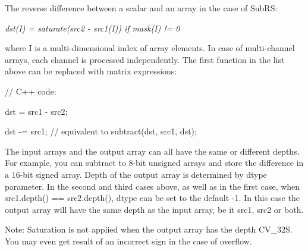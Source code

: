 \begin{DoxyItemize}
\item The reverse difference between a scalar and an array in the case of {\ttfamily Sub\+RS}\+: 
\end{DoxyItemize}

{\itshape dst(\+I) = saturate(src2 -\/ src1(\+I)) if mask(\+I) != 0}

where {\ttfamily I} is a multi-\/dimensional index of array elements. In case of multi-\/channel arrays, each channel is processed independently. The first function in the list above can be replaced with matrix expressions\+: {\ttfamily }

{\ttfamily }

{\ttfamily }

{\ttfamily // C++ code\+:}

{\ttfamily }

{\ttfamily }

{\ttfamily dst = src1 -\/ src2;}

{\ttfamily }

{\ttfamily }

{\ttfamily dst -\/= src1; // equivalent to subtract(dst, src1, dst);}

{\ttfamily }

{\ttfamily }

{\ttfamily The input arrays and the output array can all have the same or different depths. For example, you can subtract to 8-\/bit unsigned arrays and store the difference in a 16-\/bit signed array. Depth of the output array is determined by {\ttfamily dtype} parameter. In the second and third cases above, as well as in the first case, when {\ttfamily src1.\+depth() == src2.\+depth()}, {\ttfamily dtype} can be set to the default {\ttfamily -\/1}. In this case the output array will have the same depth as the input array, be it {\ttfamily src1}, {\ttfamily src2} or both. }

Note\+: Saturation is not applied when the output array has the depth {\ttfamily C\+V\+\_\+32S}. You may even get result of an incorrect sign in the case of overflow.


